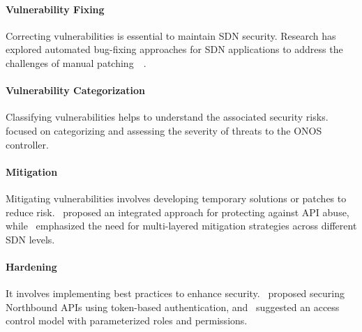 \paragraph{Vulnerability Fixing} Correcting vulnerabilities is essential to maintain SDN security. Research has explored automated bug-fixing approaches for SDN applications to address the challenges of manual patching~\citep{10.5555/3154630.3154688}~\citep{10.1145/2834050.2834112}.

\paragraph{Vulnerability Categorization} Classifying vulnerabilities helps to understand the associated security risks.~\cite{10.1007/978-3-319-69456-6_27} focused on categorizing and assessing the severity of threats to the ONOS controller.

\paragraph{Mitigation} Mitigating vulnerabilities involves developing temporary solutions or patches to reduce risk.~\cite{7997249} proposed an integrated approach for protecting against API abuse, while~\cite{Shu2016} emphasized the need for multi-layered mitigation strategies across different SDN levels.

\paragraph{Hardening} It involves implementing best practices to enhance security.~\cite{7182679} proposed securing Northbound APIs using token-based authentication, and~\cite{9319021} suggested an access control model with parameterized roles and permissions.

